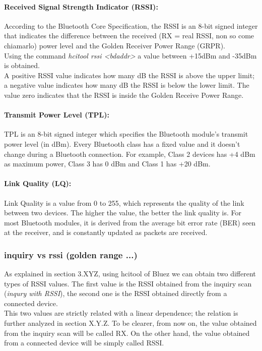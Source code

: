 \paragraph{Received Signal Strength Indicator (RSSI):}
According to the Bluetooth Core Specification, the RSSI is an 8-bit signed integer that indicates the difference between the received (RX = real RSSI, non so come chiamarlo) power level and the Golden Receiver Power Range (GRPR). \\
Using the command \textit{hcitool rssi <bdaddr>} a value between +15dBm and -35dBm is obtained. \\
A positive RSSI value indicates how many dB the RSSI is above the upper limit; a negative value indicates how many dB the RSSI is below the lower limit. The value zero indicates that the RSSI is inside the Golden Receive Power Range.

\paragraph{Transmit Power Level (TPL):}
TPL is an 8-bit signed integer which specifies the Bluetooth module's transmit power level (in dBm). Every Bluetooth class has a fixed value and it doesn't change during a Bluetooth connection. For example, Class 2 devices has +4 dBm as maximum power, Class 3 has 0 dBm and Class 1 has +20 dBm.

\paragraph{Link Quality (LQ):}
Link Quality is a value from 0 to 255, which represents the quality of the link between two devices. The higher the value, the better the link quality is. For most Bluetooth modules, it is derived from the average bit error rate (BER) seen at the receiver, and is constantly updated as packets are received.

\subsubsection{inquiry vs rssi (golden range ...)}
As explained in section 3.XYZ, using hcitool of Bluez we can obtain two different types of RSSI values.
The first value is the RSSI obtained from the inquiry scan (\textit{inqury with RSSI}), the second one is the RSSI obtained directly from a connected device.\\
This two values are strictly related with a linear dependence; the relation is further analyzed in section X.Y.Z. 
To be clearer, from now on, the value obtained from the inquiry scan will be called RX. On the other hand, the value obtained from a connected device will be simply called RSSI.

